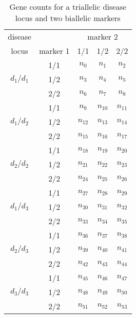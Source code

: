 \begin{table}[h]
\centering
\caption{Gene counts for a triallelic disease locus and two biallelic markers\label{d3n}}
\vskip 0.3cm
\begin{tabular}{ccccc}
\hline
disease & & \multicolumn{3}{c}{marker 2}\\ \cline{3-5}
locus & marker 1 & 1/1 & 1/2 & 2/2 \\
\hline
          & 1/1 & $n_0$ & $n_1$ & $n_2$ \\
$d_1/d_1$ & 1/2 & $n_3$ & $n_4$ & $n_5$ \\
          & 2/2 & $n_6$ & $n_7$ & $n_8$ \\
          & 1/1 & $n_{9}$ & $n_{10}$ & $n_{11}$ \\
$d_1/d_2$ & 1/2 & $n_{12}$ & $n_{13}$ & $n_{14}$ \\
          & 2/2 & $n_{15}$ & $n_{16}$ & $n_{17}$ \\
          & 1/1 & $n_{18}$ & $n_{19}$ & $n_{20}$ \\
$d_2/d_2$ & 1/2 & $n_{21}$ & $n_{22}$ & $n_{23}$ \\
          & 2/2 & $n_{24}$ & $n_{25}$ & $n_{26}$ \\
          & 1/1 & $n_{27}$ & $n_{28}$ & $n_{29}$ \\
$d_1/d_3$ & 1/2 & $n_{30}$ & $n_{31}$ & $n_{32}$ \\
          & 2/2 & $n_{33}$ & $n_{34}$ & $n_{35}$ \\
          & 1/1 & $n_{36}$ & $n_{37}$ & $n_{38}$ \\
$d_2/d_3$ & 1/2 & $n_{39}$ & $n_{40}$ & $n_{41}$ \\
          & 2/2 & $n_{42}$ & $n_{43}$ & $n_{44}$ \\
          & 1/1 & $n_{45}$ & $n_{46}$ & $n_{47}$ \\
$d_3/d_3$ & 1/2 & $n_{48}$ & $n_{49}$ & $n_{50}$ \\
          & 2/2 & $n_{51}$ & $n_{52}$ & $n_{53}$ \\
\hline
\end{tabular}
\end{table}


